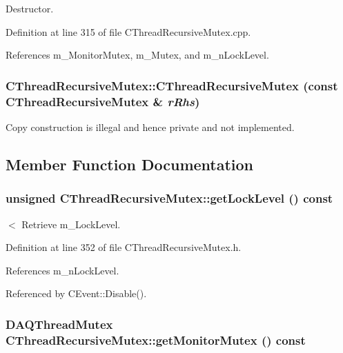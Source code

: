 Destructor.



Definition at line 315 of file CThread\-Recursive\-Mutex.cpp.

References m\_\-Monitor\-Mutex, m\_\-Mutex, and m\_\-n\-Lock\-Level.
\subsubsection{\setlength{\rightskip}{0pt plus 5cm}CThread\-Recursive\-Mutex::CThread\-Recursive\-Mutex (const CThread\-Recursive\-Mutex \& {\em r\-Rhs})\hspace{0.3cm}{\tt  [private]}}\label{classCThreadRecursiveMutex_c0}


Copy construction is illegal and hence private and not implemented. 

\subsection{Member Function Documentation}
\subsubsection{\setlength{\rightskip}{0pt plus 5cm}unsigned CThread\-Recursive\-Mutex::get\-Lock\-Level () const\hspace{0.3cm}{\tt  [inline]}}\label{classCThreadRecursiveMutex_a4}


$<$ Retrieve m\_\-Lock\-Level.



Definition at line 352 of file CThread\-Recursive\-Mutex.h.

References m\_\-n\-Lock\-Level.

Referenced by CEvent::Disable().
\subsubsection{\setlength{\rightskip}{0pt plus 5cm}DAQThread\-Mutex CThread\-Recursive\-Mutex::get\-Monitor\-Mutex () const\hspace{0.3cm}{\tt  [inline]}}\label{classCThreadRecursiveMutex_a5}


